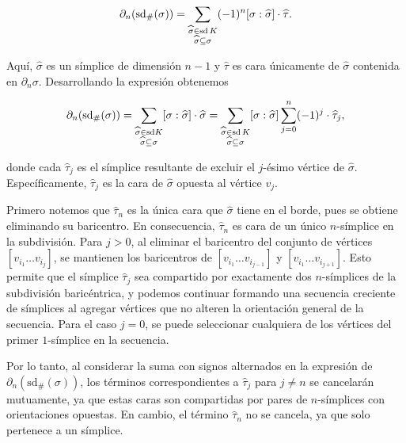 \begin{equation}
	\label{eq:subdv-borde}
	\partial_n(\text{sd}_\#(\sigma)) = \sum_{\substack{\widehat{\sigma} \in  \operatorname{sd} K \\ \widehat{\sigma} \subseteq \sigma}} (-1)^n [\sigma : \widehat{\sigma}] \cdot \widehat{\tau}.
\end{equation}

Aquí, \( \widehat{\sigma} \) es un símplice de dimensión \( n-1 \) y \( \widehat{\tau} \) es cara únicamente de \( \widehat{\sigma} \) contenida en \( \partial_n\sigma \). Desarrollando la expresión obtenemos

\[
\partial_n(\text{sd}_\#(\sigma)) = \sum_{\substack{\widehat{\sigma} \in \text{sd} K \\ \widehat{\sigma} \subseteq \sigma}} [\sigma : \widehat{\sigma}] \cdot \widehat{\sigma} = \sum_{\substack{\widehat{\sigma} \in  \operatorname{sd} K \\ \widehat{\sigma} \subseteq \sigma}} [\sigma : \widehat{\sigma}] \sum_{j=0}^n (-1)^j \cdot \widehat{\tau}_j,
\]

donde cada \( \widehat{\tau}_j \) es el símplice resultante de excluir el \( j \)-ésimo vértice de \( \widehat{\sigma} \). Específicamente, \( \widehat{\tau}_j \) es la cara de \( \widehat{\sigma} \) opuesta al vértice \( v_j \).

Primero notemos que  \( \widehat{\tau}_n \) es la única cara que  \( \widehat{\sigma} \) tiene en el borde, pues se obtiene eliminando su baricentro. En consecuencia, \( \widehat{\tau}_n \) es cara de un único \( n \)-símplice en la subdivisión. Para \( j > 0 \), al eliminar el baricentro del conjunto de vértices \( [v_{i_1} \ldots v_{i_j}] \), se mantienen los baricentros de \( [v_{i_1} \ldots v_{i_{j-1}}] \) y \( [v_{i_1} \ldots v_{i_{j+1}}] \). Esto permite que el símplice \( \widehat{\tau}_j \) sea compartido por exactamente dos \( n \)-símplices de la subdivisión baricéntrica, y podemos continuar formando una secuencia creciente de símplices al agregar vértices que no alteren la orientación general de la secuencia. Para el caso \( j = 0 \), se puede seleccionar cualquiera de los vértices del primer $1$-símplice en la secuencia.

Por lo tanto, al considerar la suma con signos alternados en la expresión de \( \partial_n(\text{sd}_\#(\sigma)) \), los términos correspondientes a \( \widehat{\tau}_j \) para \( j \neq n \) se cancelarán mutuamente, ya que estas caras son compartidas por pares de \( n \)-símplices con orientaciones opuestas. En cambio, el término \( \widehat{\tau}_n \) no se cancela, ya que solo pertenece a un símplice.

